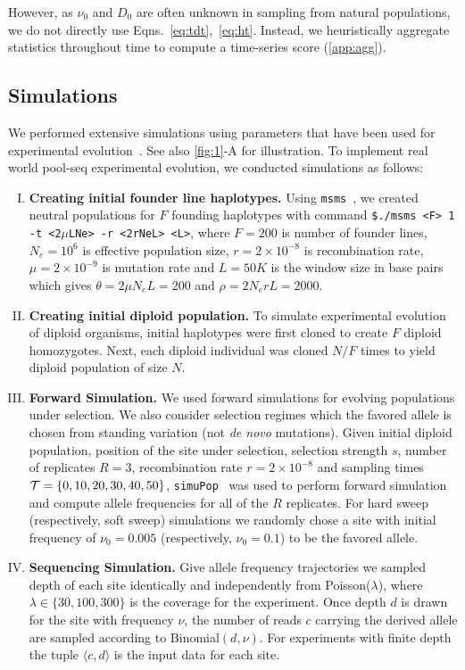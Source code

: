 {However, as $\nu_0$ and $D_0$ are often unknown in sampling from
natural populations, we do not directly use
Eqns.~\ref{eq:tdt},~\ref{eq:ht}. Instead, we heuristically aggregate
statistics throughout time to compute a time-series score
(\ref{app:agg}).
}


		


\subsection{Simulations}
We performed extensive simulations using parameters that have been
used for \dmel experimental
evolution~\cite{kofler2013guide}. See also \ref{fig:1}-A 
for
illustration. To implement real world pool-seq experimental evolution, we 
conducted simulations as follows:
\begin{enumerate}[I.]
\item {\bf Creating initial founder line haplotypes.} Using
  \texttt{msms}~\cite{ewing2010msms}, we created neutral populations for $F$
  founding haplotypes with command \texttt{\$./msms
    <F> 1 -t <2$\mu$LNe> -r <2rNeL> <L>}, where $F=200$ is number of
  founder lines, $N_e=10^6$ is effective population size,
  $r=2\times10^{-8}$ is recombination rate, $\mu=2\times 10^{-9}$ is
  mutation rate and $L=50K$ is the window size in base pairs which
  gives $\theta=2\mu N_eL=200$ and $\rho=2N_erL=2000$.
  
\item{\bf Creating initial diploid population.} To simulate
  experimental evolution of diploid organisms, initial haplotypes were
  first cloned to create $F$ diploid homozygotes. Next, each diploid
  individual was cloned $N/F$ times to yield diploid population of
  size $N$.

\item{\bf Forward Simulation.} We used forward simulations for
  evolving populations under selection. We also consider selection
  regimes which the favored allele is chosen from standing
  variation (not \emph{de novo} mutations). Given initial diploid
  population, position of the site under selection, selection strength
  $s$, number of replicates $R=3$, recombination rate
  $r=2\times10^{-8}$ and sampling times ${\cal T}=\{0,10,20,30,40,50\}$,
  \texttt{simuPop}~\cite{peng2005simupop} was used to perform forward
  simulation and compute allele frequencies for all of the $R$
  replicates.  For hard sweep (respectively, soft sweep) simulations
  we randomly chose a site with initial frequency of $\nu_0=0.005$
  (respectively, $\nu_0=0.1$) to be the favored allele.
\item{\bf Sequencing Simulation.} Give allele frequency trajectories
  we sampled depth of each site identically and independently from
  Poisson($\lambda$), where $\lambda \in \{30,100,300\}$ is the
  coverage for the experiment. Once depth $d$ is drawn for the site
  with frequency $\nu$, the number of reads $c$ carrying the derived
  allele are sampled according to Binomial$(d,\nu)$. For experiments
  with finite depth the tuple $\langle c,d\rangle$ is the input data
  for each site. 
\end{enumerate}
